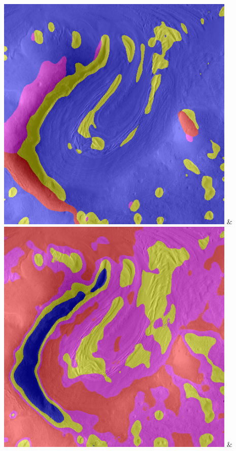 \begin{table}[h!]
\begin{tabularx}{\textwidth}
		\includegraphics[width=.9\linewidth]{images/gen/filterbanks/Gre13_05.jpg_LM.png} &
		\includegraphics[width=.9\linewidth]{images/gen/filterbanks/Gre13_05.jpg_S.png} &

\end{tabularx}
\end{table}
